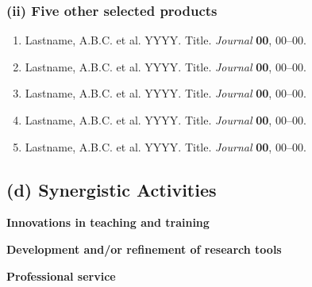 \documentclass[10pt,letterpaper]{article}
\begin{document}
\subsubsection*{(ii) Five other selected products}

\begin{enumerate}
\item Lastname, A.B.C. et al. YYYY. Title. \emph{Journal} \textbf{00}, 00--00.
\item Lastname, A.B.C. et al. YYYY. Title. \emph{Journal} \textbf{00}, 00--00.
\item Lastname, A.B.C. et al. YYYY. Title. \emph{Journal} \textbf{00}, 00--00.
\item Lastname, A.B.C. et al. YYYY. Title. \emph{Journal} \textbf{00}, 00--00.
\item Lastname, A.B.C. et al. YYYY. Title. \emph{Journal} \textbf{00}, 00--00.
\end{enumerate}


\subsection*{(d) Synergistic Activities}

\textbf{Innovations in teaching and training} 
\blindtext

\textbf{Development and/or refinement of research tools} 
\blindtext

\textbf{Professional service} 
\blindtext
\end{document}
